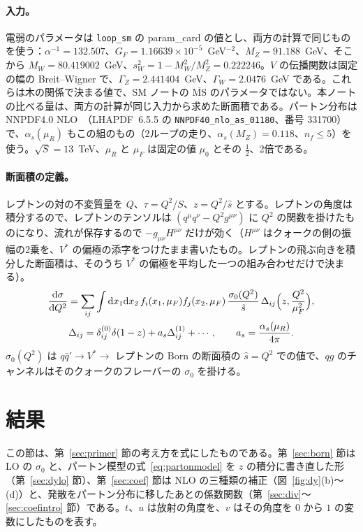 \documentclass[a4paper,10pt]{ltjsarticle}
\newcommand{\dd}{\mathrm{d}}
\newcommand{\MSbar}{\overline{\mathrm{MS}}}
\begin{document}
\paragraph{入力。}電弱のパラメータは \texttt{loop\_sm} の param\_card の値とし、両方の計算で同じものを使う：$\alpha^{-1}=132.507$、$G_F=1.16639\times10^{-5}$~GeV$^{-2}$、$M_Z=91.188$~GeV、そこから $M_W=80.419002$~GeV、$s_W^2=1-M_W^2/M_Z^2=0.222246$。$V$ の伝播関数は固定の幅の Breit--Wigner で、$\Gamma_Z=2.441404$~GeV、$\Gamma_W=2.0476$~GeV である。これらは木の関係で決まる値で、SM ノートの $\MSbar$ のパラメータではない。本ノートの比べる量は、両方の計算が同じ入力から求めた断面積である。パートン分布は NNPDF4.0 NLO~\cite{nnpdf40}（LHAPDF~6.5.5 の \texttt{NNPDF40\_nlo\_as\_01180}、番号 331700）で、$\alpha_s(\mu_R)$ もこの組のもの（2ループの走り、$\alpha_s(M_Z)=0.118$、$n_f\le5$）を使う。$\sqrt S=13$~TeV、$\mu_R$ と $\mu_F$ は固定の値 $\mu_0$ とその $\frac12$、2倍である。

\paragraph{断面積の定義。}レプトンの対の不変質量を $Q$、$\tau=Q^2/S$、$z=Q^2/\hat s$ とする。レプトンの角度は積分するので、レプトンのテンソルは $(q^\mu q^\nu-Q^2g^{\mu\nu})$ に $Q^2$ の関数を掛けたものになり、流れが保存するので $-g_{\mu\nu}H^{\mu\nu}$ だけが効く（$H^{\mu\nu}$ はクォークの側の振幅の2乗を、$V^*$ の偏極の添字をつけたまま書いたもの。レプトンの飛ぶ向きを積分した断面積は、そのうち $V^*$ の偏極を平均した一つの組み合わせだけで決まる）。
\begin{equation}
\begin{gathered}
\frac{\dd\sigma}{\dd Q^2}=\sum_{ij}\int\dd x_1\dd x_2\,f_i(x_1,\mu_F)f_j(x_2,\mu_F)\,\frac{\sigma_0(Q^2)}{\hat s}\,\Delta_{ij}\Bigl(z,\frac{Q^2}{\mu_F^2}\Bigr),\\
\Delta_{ij}=\delta_{ij}^{(0)}\delta(1-z)+a_s\Delta^{(1)}_{ij}+\cdots,\qquad a_s=\frac{\alpha_s(\mu_R)}{4\pi}.
\end{gathered}
\label{eq:had}
\end{equation}
$\sigma_0(Q^2)$ は $q\bar q'\to V^*\to$ レプトンの Born の断面積の $\hat s=Q^2$ での値で、$qg$ のチャンネルはそのクォークのフレーバーの $\sigma_0$ を掛ける。

\section{結果}\label{sec:results}

この節は、第~\ref{sec:primer} 節の考え方を式にしたものである。第~\ref{sec:born} 節は LO の $\sigma_0$ と、パートン模型の式~\eqref{eq:partonmodel} を $z$ の積分に書き直した形（第~\ref{sec:dylo} 節）、第~\ref{sec:coef} 節は NLO の三種類の補正（図~\ref{fig:dy}(b)〜(d)）と、発散をパートン分布に移したあとの係数関数（第~\ref{sec:div}〜\ref{sec:coefintro} 節）である。$t$、$u$ は放射の角度を、$v$ はその角度を $0$ から $1$ の変数にしたものを表す。
\end{document}
